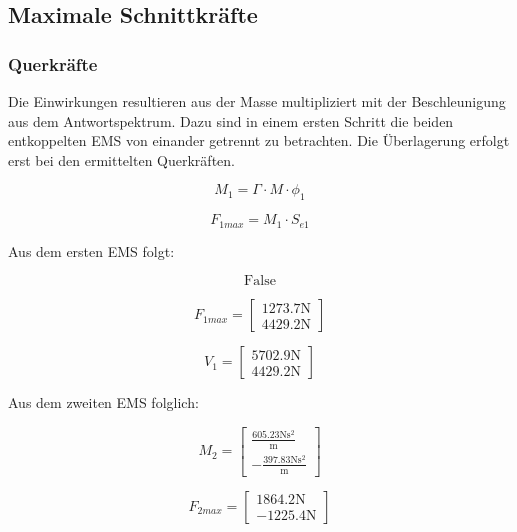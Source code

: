 \documentclass[
  letterpaper,
  DIV=11]{scrreprt}
\begin{document}
\hypertarget{maximale-schnittkruxe4fte-1}{%
\subsection{Maximale Schnittkräfte}\label{maximale-schnittkruxe4fte-1}}

\hypertarget{querkruxe4fte-1}{%
\subsubsection{Querkräfte}\label{querkruxe4fte-1}}

Die Einwirkungen resultieren aus der Masse multipliziert mit der
Beschleunigung aus dem Antwortspektrum. Dazu sind in einem ersten
Schritt die beiden entkoppelten EMS von einander getrennt zu betrachten.
Die Überlagerung erfolgt erst bei den ermittelten Querkräften.

\[
M_1 = \Gamma \cdot M \cdot \phi_1
\]

\[
F_{1max} = M_1 \cdot S_{e1}
\]

Aus dem ersten EMS folgt:

\begin{equation}\text{False}\end{equation}

\begin{equation}F_{1 max} = \left[\begin{matrix}1273.7 \text{N}\\4429.2 \text{N}\end{matrix}\right]\end{equation}

\begin{equation}V_{1} = \left[\begin{matrix}5702.9 \text{N}\\4429.2 \text{N}\end{matrix}\right]\end{equation}

Aus dem zweiten EMS folglich:

\begin{equation}M_{2} = \left[\begin{matrix}\frac{605.23 \text{N} \text{s}^{2}}{\text{m}}\\- \frac{397.83 \text{N} \text{s}^{2}}{\text{m}}\end{matrix}\right]\end{equation}

\begin{equation}F_{2 max} = \left[\begin{matrix}1864.2 \text{N}\\- 1225.4 \text{N}\end{matrix}\right]\end{equation}
\end{document}
